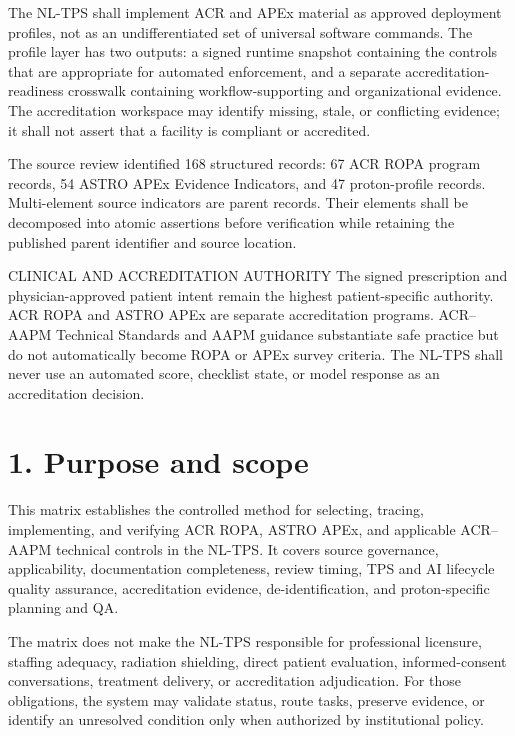 \documentclass[11pt,letterpaper]{article}
\begin{document}

The NL-TPS shall implement ACR and APEx material as approved deployment profiles, not as an undifferentiated set of universal software commands. The profile layer has two outputs: a signed runtime snapshot containing the controls that are appropriate for automated enforcement, and a separate accreditation-readiness crosswalk containing workflow-supporting and organizational evidence. The accreditation workspace may identify missing, stale, or conflicting evidence; it shall not assert that a facility is compliant or accredited.

The source review identified 168 structured records: 67 ACR ROPA program records, 54 ASTRO APEx Evidence Indicators, and 47 proton-profile records. Multi-element source indicators are parent records. Their elements shall be decomposed into atomic assertions before verification while retaining the published parent identifier and source location.

\begin{nlnotice}{CLINICAL AND ACCREDITATION AUTHORITY}
The signed prescription and physician-approved patient intent remain the highest patient-specific authority. ACR ROPA and ASTRO APEx are separate accreditation programs. ACR--AAPM Technical Standards and AAPM guidance substantiate safe practice but do not automatically become ROPA or APEx survey criteria. The NL-TPS shall never use an automated score, checklist state, or model response as an accreditation decision.
\end{nlnotice}

\section{1. Purpose and scope}

This matrix establishes the controlled method for selecting, tracing, implementing, and verifying ACR ROPA, ASTRO APEx, and applicable ACR--AAPM technical controls in the NL-TPS. It covers source governance, applicability, documentation completeness, review timing, TPS and AI lifecycle quality assurance, accreditation evidence, de-identification, and proton-specific planning and QA.

The matrix does not make the NL-TPS responsible for professional licensure, staffing adequacy, radiation shielding, direct patient evaluation, informed-consent conversations, treatment delivery, or accreditation adjudication. For those obligations, the system may validate status, route tasks, preserve evidence, or identify an unresolved condition only when authorized by institutional policy.
\end{document}
